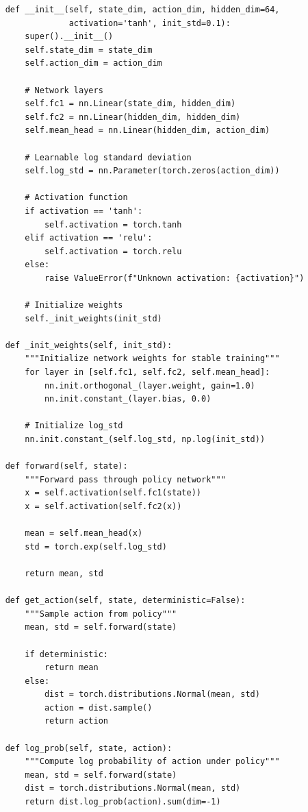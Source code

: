 \documentclass[12pt]{article}
\begin{document}
{{{{\begin{verbatim}
    def __init__(self, state_dim, action_dim, hidden_dim=64, 
                 activation='tanh', init_std=0.1):
        super().__init__()
        self.state_dim = state_dim
        self.action_dim = action_dim
        
        # Network layers
        self.fc1 = nn.Linear(state_dim, hidden_dim)
        self.fc2 = nn.Linear(hidden_dim, hidden_dim)
        self.mean_head = nn.Linear(hidden_dim, action_dim)
        
        # Learnable log standard deviation
        self.log_std = nn.Parameter(torch.zeros(action_dim))
        
        # Activation function
        if activation == 'tanh':
            self.activation = torch.tanh
        elif activation == 'relu':
            self.activation = torch.relu
        else:
            raise ValueError(f"Unknown activation: {activation}")
        
        # Initialize weights
        self._init_weights(init_std)
    
    def _init_weights(self, init_std):
        """Initialize network weights for stable training"""
        for layer in [self.fc1, self.fc2, self.mean_head]:
            nn.init.orthogonal_(layer.weight, gain=1.0)
            nn.init.constant_(layer.bias, 0.0)
        
        # Initialize log_std
        nn.init.constant_(self.log_std, np.log(init_std))
    
    def forward(self, state):
        """Forward pass through policy network"""
        x = self.activation(self.fc1(state))
        x = self.activation(self.fc2(x))
        
        mean = self.mean_head(x)
        std = torch.exp(self.log_std)
        
        return mean, std
    
    def get_action(self, state, deterministic=False):
        """Sample action from policy"""
        mean, std = self.forward(state)
        
        if deterministic:
            return mean
        else:
            dist = torch.distributions.Normal(mean, std)
            action = dist.sample()
            return action
    
    def log_prob(self, state, action):
        """Compute log probability of action under policy"""
        mean, std = self.forward(state)
        dist = torch.distributions.Normal(mean, std)
        return dist.log_prob(action).sum(dim=-1)
    

\end{verbatim}}}}}
\end{document}
